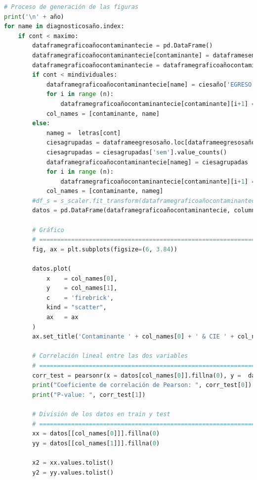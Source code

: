 \begin{lstlisting}[language=Python, caption=Procedimiento del segundo paso, label=lst:c4]
# Proceso de generación de las figuras
print('\n' + año)
for name in diagnosticosaño.index:
    if cont < maximo:
        dataframegraficoañocontaminantecie = pd.DataFrame()
        dataframegraficoañocontaminantecie[contaminante] = dataframesemanascontaminanteaño[contaminante]
        dataframegraficoañocontaminantecie = dataframegraficoañocontaminantecie.reindex(ind)
        if cont < mindividuales:
            dataframegraficoañocontaminantecie[name] = ciesaño['EGRESO'][name]
            for i in range (n):
                dataframegraficoañocontaminantecie[contaminante][i+1] = dataframesemanascontaminanteaño[contaminante][i]
            col_names = [contaminante, name]    
        else:
            nameg =  letras[cont]
            ciesagrupadas = dataframeegresosaño.loc[dataframeegresosaño['DIAG_INI'].str.startswith(nameg)]
            ciesagrupadas = ciesagrupadas['sem'].value_counts()
            dataframegraficoañocontaminantecie[nameg] = ciesagrupadas
            for i in range (n):
                dataframegraficoañocontaminantecie[contaminante][i+1] = dataframesemanascontaminanteaño[contaminante][i]
            col_names = [contaminante, nameg]
        #df_s = s_scaler.fit_transform(dataframegraficoañocontaminantecie)
        datos = pd.DataFrame(dataframegraficoañocontaminantecie, columns=col_names)

        # Gráfico
        # ==============================================================================
        fig, ax = plt.subplots(figsize=(6, 3.84))

        datos.plot(
            x    = col_names[0],
            y    = col_names[1],
            c    = 'firebrick',
            kind = "scatter",
            ax   = ax
        )
        ax.set_title('Contaminante ' + col_names[0] + ' & CIE ' + col_names[1])

        # Correlación lineal entre las dos variables
        # ==============================================================================
        corr_test = pearsonr(x = datos[col_names[0]].fillna(0), y =  datos[col_names[1]].fillna(0))
        print("Coeficiente de correlación de Pearson: ", corr_test[0])
        print("P-value: ", corr_test[1])

        # División de los datos en train y test
        # ==============================================================================
        xx = datos[[col_names[0]]].fillna(0)
        yy = datos[[col_names[1]]].fillna(0)
        
        x2 = xx.values.tolist()
        y2 = yy.values.tolist()


\end{lstlisting}
